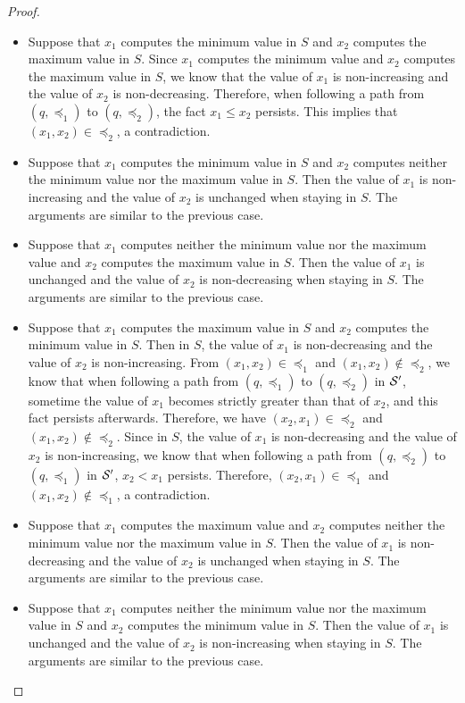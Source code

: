 \begin{appendix}
\begin{proof}
\begin{itemize}
%
\item Suppose that $x_1$ computes the minimum value in $S$ and $x_2$ computes the maximum value in $S$. Since $x_1$ computes the minimum value and $x_2$ computes the maximum value in $S$, we know that the value of $x_1$ is non-increasing and the value of $x_2$ is non-decreasing. Therefore, when following a path from $(q, \preceq_1)$ to $(q, \preceq_2)$, the fact $x_1 \le x_2$ persists. This implies that $(x_1, x_2) \in \preceq_2$, a contradiction.
%
\item Suppose that $x_1$ computes the minimum value in $S$ and $x_2$ computes neither the minimum value nor the maximum value in $S$. Then the value of $x_1$ is non-increasing and the value of $x_2$ is unchanged when staying in $S$. The arguments are similar to the previous case.
%
\item Suppose that $x_1$ computes neither the minimum value nor the maximum value and $x_2$ computes the maximum value in $S$. Then the value of $x_1$ is unchanged and the value of $x_2$ is non-decreasing when staying in $S$. The arguments are similar to the previous case.
%
\item Suppose that $x_1$ computes the maximum value in $S$ and $x_2$ computes the minimum value in $S$.  Then in $S$, the value of $x_1$ is non-decreasing and the value of $x_2$ is non-increasing.  From $(x_1, x_2) \in \preceq_1$ and $(x_1, x_2) \not \in \preceq_2$, we know that when following a path from $(q, \preceq_1)$ to $(q, \preceq_2)$ in ${\mathcal{S} }'$, sometime the value of $x_1$ becomes strictly greater than that of $x_2$, and this fact persists afterwards. Therefore, we have $(x_2, x_1) \in \preceq_2$ and $(x_1, x_2) \not \in \preceq_2$. Since in $S$, the value of $x_1$ is non-decreasing and the value of $x_2$ is non-increasing, we know that when following a path from $(q, \preceq_2)$ to $(q, \preceq_1)$ in ${\mathcal{S} }'$, $x_2 < x_1$ persists. Therefore, $(x_2, x_1) \in \preceq_1$ and $(x_1, x_2) \not \in \preceq_1$, a contradiction.
%
\item Suppose that $x_1$ computes the maximum value and  $x_2$ computes neither the minimum value nor the maximum value in $S$. Then the value of $x_1$ is non-decreasing and the value of $x_2$ is unchanged when staying in $S$. The arguments are similar to the previous case.
%
\item Suppose that $x_1$ computes neither the minimum value nor the maximum value in $S$ and $x_2$ computes the minimum value in $S$. Then the value of $x_1$ is unchanged and the value of $x_2$ is non-increasing when staying in $S$. The arguments are similar to the previous case.

\end{itemize}
\end{proof}
\end{appendix}
